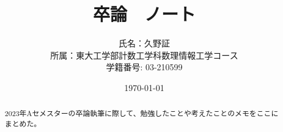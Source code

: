 \documentclass{ltjsarticle}
\title{卒論　ノート}
\author{氏名：久野証\\所属：東大工学部計数工学科数理情報工学コース\\学籍番号: 03-210599}
\date{\today}
\begin{document}
  \maketitle
  \tableofcontents
  \begin{abstract}
    2023年Aセメスターの卒論執筆に際して、勉強したことや考えたことのメモをここにまとめた。
  \end{abstract}
  \clearpage

  
  
  
  
\end{document}
